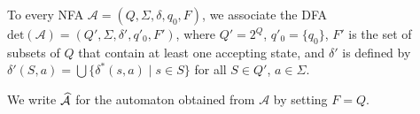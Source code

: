 \bigskip

\begin{definition}[Determinization]\label{def:det}
To every NFA $\mathcal{A} = (Q, \Sigma, \delta, q_0, F)$, we associate  
the DFA $\text{det}(\mathcal{A}) = (Q', \Sigma, \delta', q'_0, F')$,  
where $Q' = 2^Q$, $q'_0 = \{q_0\}$, $F'$ is the set of subsets of $Q$  
that contain at least one accepting state, and $\delta'$ is defined by  
$\delta'(S,a) = \bigcup\{\delta^*(s,a) \mid s \in S\}$ for all  
$S \in Q'$, $a \in \Sigma$.  
\end{definition}

We write $\widehat{\mathcal A}{}$ for the automaton obtained
from $\mathcal A$ by setting $F=Q$.






